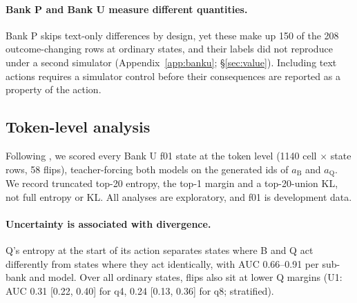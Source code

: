\paragraph{Bank P and Bank U measure different quantities.} Bank P skips text-only differences by design, yet these make up 150 of the 208 outcome-changing rows at ordinary states, and their labels did not reproduce under a second simulator (Appendix~\ref{app:banku}; \S\ref{sec:value}). Including text actions requires a simulator control before their consequences are reported as a property of the action. %

\subsection{Token-level analysis}
\label{app:token}

Following \citet{lotfi2026quantized}, we scored every Bank U f01 state at the token level (1140 cell $\times$ state rows, 58 flips), teacher-forcing both models on the generated ids of $a_{\mathrm{B}}$ and $a_{\mathrm{Q}}$. We record truncated top-20 entropy, the top-1 margin and a top-20-union KL, not full entropy or KL. All analyses are exploratory, and f01 is development data. %

\paragraph{Uncertainty is associated with divergence.} Q's entropy at the start of its action separates states where B and Q act differently from states where they act identically, with AUC 0.66--0.91 per sub-bank and model. Over all ordinary states, flips also sit at lower Q margins (U1: AUC 0.31 [0.22, 0.40] for q4, 0.24 [0.13, 0.36] for q8; stratified). %

